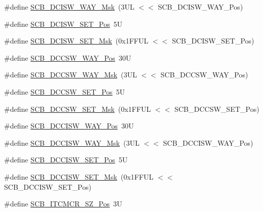 \begin{DoxyCompactItemize}
\item 
\#define \mbox{\hyperlink{group__CMSIS__SCB_gabfe6096a36807e0b7e1d09a06ef1d750}{S\+C\+B\+\_\+\+D\+C\+I\+S\+W\+\_\+\+W\+A\+Y\+\_\+\+Msk}}~(3\+U\+L $<$$<$ S\+C\+B\+\_\+\+D\+C\+I\+S\+W\+\_\+\+W\+A\+Y\+\_\+\+Pos)
\item 
\#define \mbox{\hyperlink{group__CMSIS__SCB_gaea6bd5b7d1c47c7db06afdecc6e49281}{S\+C\+B\+\_\+\+D\+C\+I\+S\+W\+\_\+\+S\+E\+T\+\_\+\+Pos}}~5U
\item 
\#define \mbox{\hyperlink{group__CMSIS__SCB_gab08fbef94f7d068a7c0217e074c697f9}{S\+C\+B\+\_\+\+D\+C\+I\+S\+W\+\_\+\+S\+E\+T\+\_\+\+Msk}}~(0x1\+F\+F\+U\+L $<$$<$ S\+C\+B\+\_\+\+D\+C\+I\+S\+W\+\_\+\+S\+E\+T\+\_\+\+Pos)
\item 
\#define \mbox{\hyperlink{group__CMSIS__SCB_ga6cac2d69791e13af276d8306c796925f}{S\+C\+B\+\_\+\+D\+C\+C\+S\+W\+\_\+\+W\+A\+Y\+\_\+\+Pos}}~30U
\item 
\#define \mbox{\hyperlink{group__CMSIS__SCB_ga8374e67655ac524284c9bb59eb2efa23}{S\+C\+B\+\_\+\+D\+C\+C\+S\+W\+\_\+\+W\+A\+Y\+\_\+\+Msk}}~(3\+U\+L $<$$<$ S\+C\+B\+\_\+\+D\+C\+C\+S\+W\+\_\+\+W\+A\+Y\+\_\+\+Pos)
\item 
\#define \mbox{\hyperlink{group__CMSIS__SCB_gae93985adc38a127bc8dc909ac58e8fea}{S\+C\+B\+\_\+\+D\+C\+C\+S\+W\+\_\+\+S\+E\+T\+\_\+\+Pos}}~5U
\item 
\#define \mbox{\hyperlink{group__CMSIS__SCB_ga669e16d98c8ea0e66afb04641971d98c}{S\+C\+B\+\_\+\+D\+C\+C\+S\+W\+\_\+\+S\+E\+T\+\_\+\+Msk}}~(0x1\+F\+F\+U\+L $<$$<$ S\+C\+B\+\_\+\+D\+C\+C\+S\+W\+\_\+\+S\+E\+T\+\_\+\+Pos)
\item 
\#define \mbox{\hyperlink{group__CMSIS__SCB_gaa90bd0b36679219d6a2144eba6eb96cd}{S\+C\+B\+\_\+\+D\+C\+C\+I\+S\+W\+\_\+\+W\+A\+Y\+\_\+\+Pos}}~30U
\item 
\#define \mbox{\hyperlink{group__CMSIS__SCB_gaf2269bbe0bc7705e1da8f5ee0f581054}{S\+C\+B\+\_\+\+D\+C\+C\+I\+S\+W\+\_\+\+W\+A\+Y\+\_\+\+Msk}}~(3\+U\+L $<$$<$ S\+C\+B\+\_\+\+D\+C\+C\+I\+S\+W\+\_\+\+W\+A\+Y\+\_\+\+Pos)
\item 
\#define \mbox{\hyperlink{group__CMSIS__SCB_ga525f1bb9849e89b3eafbd53dcd51e296}{S\+C\+B\+\_\+\+D\+C\+C\+I\+S\+W\+\_\+\+S\+E\+T\+\_\+\+Pos}}~5U
\item 
\#define \mbox{\hyperlink{group__CMSIS__SCB_gaf1b0bea5ab77d4ad7d5c21e77ca463ad}{S\+C\+B\+\_\+\+D\+C\+C\+I\+S\+W\+\_\+\+S\+E\+T\+\_\+\+Msk}}~(0x1\+F\+F\+U\+L $<$$<$ S\+C\+B\+\_\+\+D\+C\+C\+I\+S\+W\+\_\+\+S\+E\+T\+\_\+\+Pos)
\item 
\#define \mbox{\hyperlink{group__CMSIS__SCB_ga86b58242b8286aba9318e2062d88f341}{S\+C\+B\+\_\+\+I\+T\+C\+M\+C\+R\+\_\+\+S\+Z\+\_\+\+Pos}}~3U

\end{DoxyCompactItemize}
